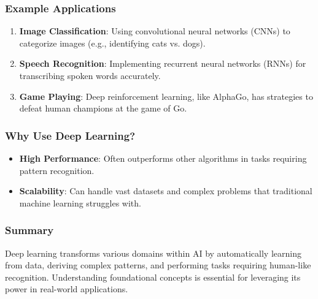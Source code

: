 \documentclass[aspectratio=169]{beamer}
\begin{document}
\begin{frame}[fragile]
    \frametitle{Example Applications}
    \begin{enumerate}
        \item \textbf{Image Classification}: Using convolutional neural networks (CNNs) to categorize images (e.g., identifying cats vs. dogs).
        
        \item \textbf{Speech Recognition}: Implementing recurrent neural networks (RNNs) for transcribing spoken words accurately.
        
        \item \textbf{Game Playing}: Deep reinforcement learning, like AlphaGo, has strategies to defeat human champions at the game of Go.
    \end{enumerate}
\end{frame}

\begin{frame}[fragile]
    \frametitle{Why Use Deep Learning?}
    \begin{itemize}
        \item \textbf{High Performance}: Often outperforms other algorithms in tasks requiring pattern recognition.
        
        \item \textbf{Scalability}: Can handle vast datasets and complex problems that traditional machine learning struggles with.
    \end{itemize}
\end{frame}

\begin{frame}[fragile]
    \frametitle{Summary}
    Deep learning transforms various domains within AI by automatically learning from data, deriving complex patterns, and performing tasks requiring human-like recognition. Understanding foundational concepts is essential for leveraging its power in real-world applications.
\end{frame}
\end{document}
